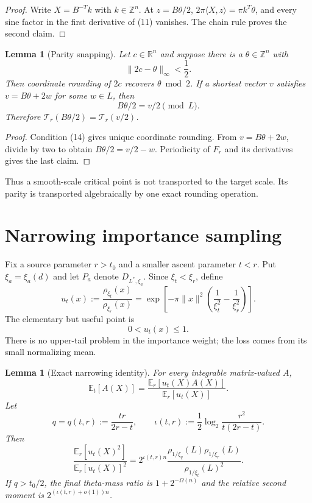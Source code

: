 \documentclass[10pt]{article}
\newtheorem{lemma}[theorem]{Lemma}
\theoremstyle{definition}
\newcommand{\R}{\mathbb{R}}
\newcommand{\Z}{\mathbb{Z}}
\newcommand{\E}{\mathbb{E}}
\newcommand{\ip}[2]{\langle #1,#2\rangle}
\newcommand{\norm}[1]{\lVert #1\rVert}
\newcommand{\cT}{\mathcal{T}}
\begin{document}
\begin{proof}
Write $X=B^{-T}k$ with $k\in\Z^n$.  At $z=B\theta/2$,
$2\pi\ip Xz=\pi k^T\theta$, and every sine factor in the first derivative of
(11) vanishes.  The chain rule proves the second claim.
\end{proof}

\begin{lemma}[Parity snapping]                                    \label{lem:snap}
Let $c\in\R^n$ and suppose there is a $\theta\in\Z^n$ with
\[
 \norm{2c-\theta}_\infty<\frac12.                                 \tag{14}
\]
Then coordinate rounding of $2c$ recovers $\theta\bmod2$.  If a shortest
vector $v$ satisfies $v=B\theta+2w$ for some $w\in L$, then
\[
 B\theta/2=v/2\pmod L.                                            \tag{15}
\]
Therefore $\cT_r(B\theta/2)=\cT_r(v/2)$.
\end{lemma}

\begin{proof}
Condition (14) gives unique coordinate rounding.  From
$v=B\theta+2w$, divide by two to obtain $B\theta/2=v/2-w$.  Periodicity of
$F_r$ and its derivatives gives the last claim.
\end{proof}

Thus a smooth-scale critical point is not transported to the target scale.
Its parity is transported algebraically by one exact rounding operation.

\section{Narrowing importance sampling}

Fix a source parameter $r>t_0$ and a smaller ascent parameter $t<r$.  Put
$\xi_a=\xi_a(d)$ and let $P_a$ denote $D_{L^*,\xi_a}$.  Since
$\xi_t<\xi_r$, define
\[
 u_t(x):=\frac{\rho_{\xi_t}(x)}{\rho_{\xi_r}(x)}
 =\exp\!\left[-\pi\norm x^2
       \left(\frac1{\xi_t^2}-\frac1{\xi_r^2}\right)\right].       \tag{16}
\]
The elementary but useful point is
\[
 0<u_t(x)\le1.                                                     \tag{17}
\]
There is no upper-tail problem in the importance weight; the loss comes from
its small normalizing mean.

\begin{lemma}[Exact narrowing identity]                            \label{lem:importance}
For every integrable matrix-valued $A$,
\[
 \E_t[A(X)]
 =\frac{\E_r[u_t(X)A(X)]}{\E_r[u_t(X)]}.                           \tag{18}
\]
Let
\[
 q=q(t,r):=\frac{tr}{2r-t},\qquad
 \iota(t,r):=\frac12\log_2\frac{r^2}{t(2r-t)}.                    \tag{19}
\]
Then
\[
 \frac{\E_r[u_t(X)^2]}{\E_r[u_t(X)]^2}
 =2^{\iota(t,r)n}
 \frac{\rho_{1/\xi_q}(L)\rho_{1/\xi_r}(L)}
      {\rho_{1/\xi_t}(L)^2}.                                     \tag{20}
\]
If $q>t_0/2$, the final theta-mass ratio is $1+2^{-\Omega(n)}$ and
the relative second moment is $2^{(\iota(t,r)+o(1))n}$.
\end{lemma}
\end{document}
